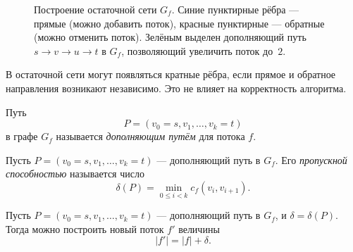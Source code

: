\begin{figure}[htb]
	\caption{Построение остаточной сети $G_f$.
		Синие пунктирные рёбра — прямые (можно добавить поток),
		красные пунктирные — обратные (можно отменить поток).
		Зелёным выделен дополняющий путь $s\to v\to u\to t$ в $G_f$,
		позволяющий увеличить поток до~$2$.}
	\label{fig:residual}
\end{figure}

\begin{Remark}{}{}
	В остаточной сети могут появляться кратные рёбра, если прямое и обратное направления возникают независимо. Это не влияет на корректность алгоритма.
\end{Remark}

\begin{Definition}{}{}
	Путь
	\[
	P=(v_0=s,v_1,\dots,v_k=t)
	\]
	в графе $G_f$ называется \emph{дополняющим путём} для потока $f$.
\end{Definition}

\begin{Definition}{}{}
	Пусть $P=(v_0=s,v_1,\dots,v_k=t)$ --- дополняющий путь в $G_f$. Его \emph{пропускной способностью} называется число
	\[
	\delta(P)=\min_{0\le i<k} c_f(v_i,v_{i+1}).
	\]
\end{Definition}

\begin{Proposition}{}{}
	Пусть $P=(v_0=s,v_1,\dots,v_k=t)$ --- дополняющий путь в $G_f$, и $\delta=\delta(P)$. Тогда можно построить новый поток $f'$ величины
	\[
	|f'|=|f|+\delta.
	\]
\end{Proposition}

